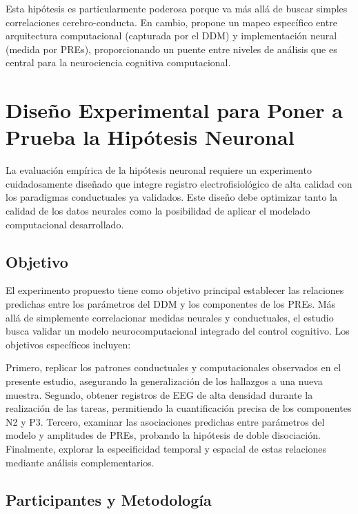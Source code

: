 \documentclass[
  spanish,
  10pt,
]{article}
\begin{document}
Esta hipótesis es particularmente poderosa porque va más allá de buscar
simples correlaciones cerebro-conducta. En cambio, propone un mapeo
específico entre arquitectura computacional (capturada por el DDM) y
implementación neural (medida por PREs), proporcionando un puente entre
niveles de análisis que es central para la neurociencia cognitiva
computacional.

\section{Diseño Experimental para Poner a Prueba la Hipótesis
Neuronal}\label{diseuxf1o-experimental-para-poner-a-prueba-la-hipuxf3tesis-neuronal}

La evaluación empírica de la hipótesis neuronal requiere un experimento
cuidadosamente diseñado que integre registro electrofisiológico de alta
calidad con los paradigmas conductuales ya validados. Este diseño debe
optimizar tanto la calidad de los datos neurales como la posibilidad de
aplicar el modelado computacional desarrollado.

\subsection{Objetivo}\label{objetivo}

El experimento propuesto tiene como objetivo principal establecer las
relaciones predichas entre los parámetros del DDM y los componentes de
los PREs. Más allá de simplemente correlacionar medidas neurales y
conductuales, el estudio busca validar un modelo neurocomputacional
integrado del control cognitivo. Los objetivos específicos incluyen:

Primero, replicar los patrones conductuales y computacionales observados
en el presente estudio, asegurando la generalización de los hallazgos a
una nueva muestra. Segundo, obtener registros de EEG de alta densidad
durante la realización de las tareas, permitiendo la cuantificación
precisa de los componentes N2 y P3. Tercero, examinar las asociaciones
predichas entre parámetros del modelo y amplitudes de PREs, probando la
hipótesis de doble disociación. Finalmente, explorar la especificidad
temporal y espacial de estas relaciones mediante análisis
complementarios.

\subsection{Participantes y
Metodología}\label{participantes-y-metodologuxeda}
\end{document}
